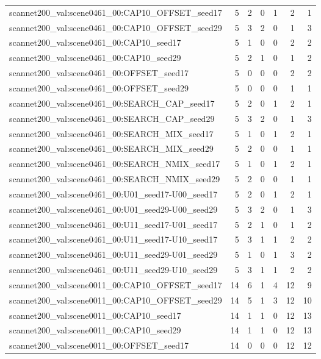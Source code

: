 \begin{table}[t]
\begin{tabular}{lrrrrrr}
scannet200\_val:scene0461\_00:CAP10\_OFFSET\_seed17 & 5 & 2 & 0 & 1 & 2 & 1 \\
scannet200\_val:scene0461\_00:CAP10\_OFFSET\_seed29 & 5 & 3 & 2 & 0 & 1 & 3 \\
scannet200\_val:scene0461\_00:CAP10\_seed17 & 5 & 1 & 0 & 0 & 2 & 2 \\
scannet200\_val:scene0461\_00:CAP10\_seed29 & 5 & 2 & 1 & 0 & 1 & 2 \\
scannet200\_val:scene0461\_00:OFFSET\_seed17 & 5 & 0 & 0 & 0 & 2 & 2 \\
scannet200\_val:scene0461\_00:OFFSET\_seed29 & 5 & 0 & 0 & 0 & 1 & 1 \\
scannet200\_val:scene0461\_00:SEARCH\_CAP\_seed17 & 5 & 2 & 0 & 1 & 2 & 1 \\
scannet200\_val:scene0461\_00:SEARCH\_CAP\_seed29 & 5 & 3 & 2 & 0 & 1 & 3 \\
scannet200\_val:scene0461\_00:SEARCH\_MIX\_seed17 & 5 & 1 & 0 & 1 & 2 & 1 \\
scannet200\_val:scene0461\_00:SEARCH\_MIX\_seed29 & 5 & 2 & 0 & 0 & 1 & 1 \\
scannet200\_val:scene0461\_00:SEARCH\_NMIX\_seed17 & 5 & 1 & 0 & 1 & 2 & 1 \\
scannet200\_val:scene0461\_00:SEARCH\_NMIX\_seed29 & 5 & 2 & 0 & 0 & 1 & 1 \\
scannet200\_val:scene0461\_00:U01\_seed17-U00\_seed17 & 5 & 2 & 0 & 1 & 2 & 1 \\
scannet200\_val:scene0461\_00:U01\_seed29-U00\_seed29 & 5 & 3 & 2 & 0 & 1 & 3 \\
scannet200\_val:scene0461\_00:U11\_seed17-U01\_seed17 & 5 & 2 & 1 & 0 & 1 & 2 \\
scannet200\_val:scene0461\_00:U11\_seed17-U10\_seed17 & 5 & 3 & 1 & 1 & 2 & 2 \\
scannet200\_val:scene0461\_00:U11\_seed29-U01\_seed29 & 5 & 1 & 0 & 1 & 3 & 2 \\
scannet200\_val:scene0461\_00:U11\_seed29-U10\_seed29 & 5 & 3 & 1 & 1 & 2 & 2 \\
scannet200\_val:scene0011\_00:CAP10\_OFFSET\_seed17 & 14 & 6 & 1 & 4 & 12 & 9 \\
scannet200\_val:scene0011\_00:CAP10\_OFFSET\_seed29 & 14 & 5 & 1 & 3 & 12 & 10 \\
scannet200\_val:scene0011\_00:CAP10\_seed17 & 14 & 1 & 1 & 0 & 12 & 13 \\
scannet200\_val:scene0011\_00:CAP10\_seed29 & 14 & 1 & 1 & 0 & 12 & 13 \\
scannet200\_val:scene0011\_00:OFFSET\_seed17 & 14 & 0 & 0 & 0 & 12 & 12 \\

\end{tabular}
\end{table}
